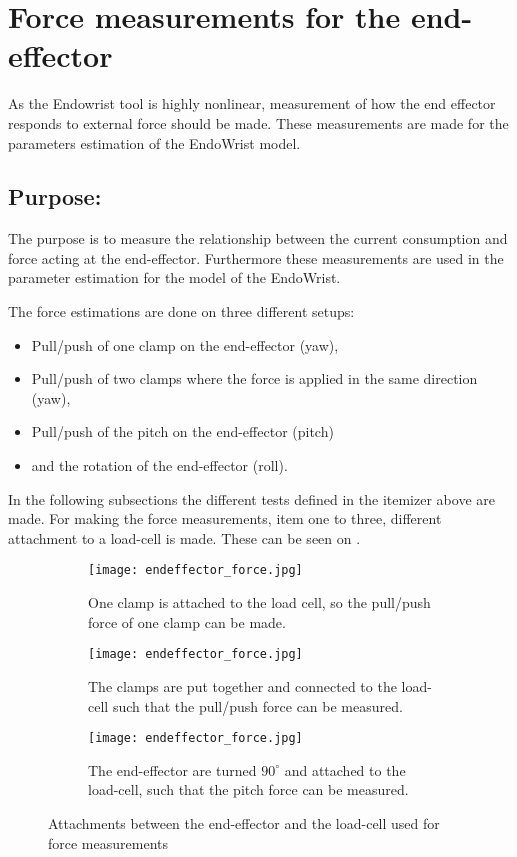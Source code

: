 \section{Force measurements for the end-effector} %

As the Endowrist tool is highly nonlinear, measurement of how the end effector responds to external force should be made. These measurements are made for the parameters estimation of the EndoWrist model.  

\subsection*{Purpose:}
The purpose is to measure the relationship between the current consumption and force acting at the end-effector. Furthermore these measurements are used in the parameter estimation for the model of the EndoWrist.

The force estimations are done on three different setups:
\begin{itemize}
\item Pull/push of one clamp on the end-effector (yaw),
\item Pull/push of two clamps where the force is applied in the same direction (yaw),
\item Pull/push of the pitch on the end-effector (pitch)
\item and the rotation of the end-effector (roll).
\end{itemize}

In the following subsections the different tests defined in the itemizer above are made. For making the force measurements, item one to three, different attachment to a load-cell is made. These can be seen on .

\begin{figure}[H]
	\centering
	\begin{subfigure}{.32\textwidth}
		\centering
		\vspace{-12pt}
		\texttt{[image: endeffector\_force.jpg]}
		\caption{One clamp is attached to the load cell, so the pull/push force of one clamp can be made.}
		\label{fig:one_clamp}
	\end{subfigure}
	\begin{subfigure}{.32\textwidth}
		\centering
		\texttt{[image: endeffector\_force.jpg]}
		\caption{The clamps are put together and connected to the load-cell such that the pull/push force can be measured.}
		\label{fig:two_clamp}
	\end{subfigure}
	\begin{subfigure}{.32\textwidth}
		\centering
		\texttt{[image: endeffector\_force.jpg]}
		\caption{The end-effector are turned $90^\circ$ and attached to the load-cell, such that the pitch force can be measured.}
		\label{fig:pitch_force}
	\end{subfigure}
\caption{Attachments between the end-effector and the load-cell used for force measurements}
\label{fig:Overview_endowrist_attachment}
\end{figure}


